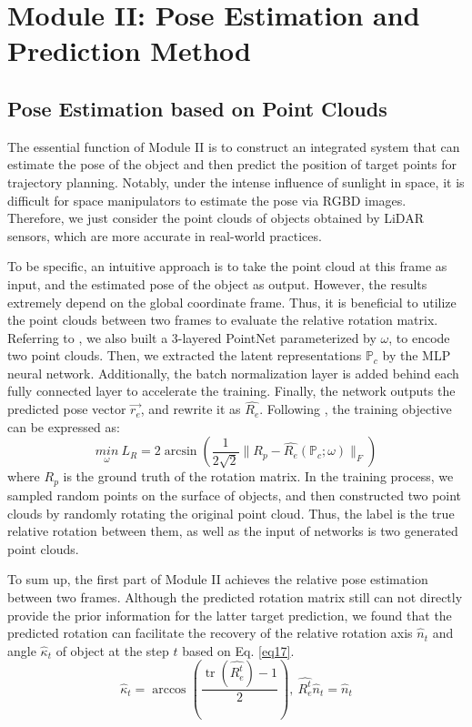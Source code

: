 \documentclass{article}
\begin{document}
\section{Module II: Pose Estimation and Prediction Method }

\subsection{Pose Estimation based on Point Clouds}

The essential function of Module II is to construct an integrated system that can estimate the pose of the object and then predict the position of target points for trajectory planning. Notably, under the intense influence of sunlight in space, it is difficult for space manipulators to estimate the pose via RGBD images. Therefore, we just consider the point clouds of objects obtained by LiDAR sensors, which are more accurate in real-world practices. 

To be specific, an intuitive approach is to take the point cloud at this frame as input, and the estimated pose of the object as output. However, the results extremely depend on the global coordinate frame. Thus, it is beneficial to utilize the point clouds between two frames to evaluate the relative rotation matrix. Referring to \cite{huang2021generalization}, we also built a 3-layered PointNet \cite{qi2017pointnet} parameterized by $\omega$, to encode two point clouds. Then, we extracted the latent representations $ \mathbb {P}_c$ by the MLP neural network. Additionally, the batch normalization layer is added behind each fully connected layer to accelerate the training. Finally, the network outputs the predicted pose vector $\vec{r_e}$, and rewrite it as $\hat{R_e}$. Following \cite{suwajanakorn2018discovery}, the training objective can be expressed as:
\begin{equation}
  \label{eq16}
\underset{\omega} {min} \ L_{R} = 2 \arcsin (\frac {1}{2\sqrt{2}}\|R_p-\hat{R_e}(\mathbb P_c;\omega)\|_F)
\end{equation}
where $R_p$ is the ground truth of the rotation matrix. In the training process, we sampled random points on the surface of objects, and then constructed two point clouds by randomly rotating the original point cloud. Thus, the label is the true relative rotation between them, as well as the input of networks is two generated point clouds. 

To sum up, the first part of Module II achieves the relative pose estimation between two frames. Although the predicted rotation matrix still can not directly provide the prior information for the latter target prediction, we found that the predicted rotation can facilitate the recovery of the relative rotation axis $\hat{n}_t$ and angle $ \hat{\kappa}_t$ of object at the step $t$ based on Eq. \eqref{eq17}.
\begin{equation}
  \label{eq17}
\hat {\kappa}_t =\operatorname{\arccos}\left(\frac{\operatorname{tr}(\hat {R_e^t})-1}{2}\right) ,\ \hat {R_e^t} \hat{n}_t = \hat{n}_t
\end{equation}
\end{document}
